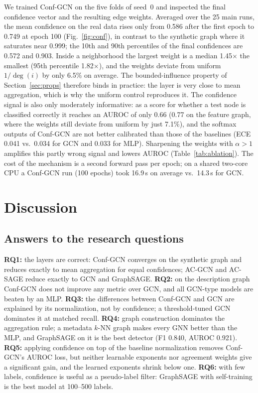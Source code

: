\documentclass[conference]{IEEEtran}
\begin{document}
We trained Conf-GCN on the five folds of seed~0 and inspected the final confidence vector and the resulting edge weights. Averaged over the 25 main runs, the mean confidence on the real data rises only from 0.586 after the first epoch to 0.749 at epoch 100 (Fig.~\ref{fig:conf}), in contrast to the synthetic graph where it saturates near 0.999; the 10th and 90th percentiles of the final confidences are 0.572 and 0.903. Inside a neighborhood the largest weight is a median 1.45$\times$ the smallest (95th percentile 1.82$\times$), and the weights deviate from uniform $1/\deg(i)$ by only 6.5\% on average. The bounded-influence property of Section~\ref{sec:props} therefore binds in practice: the layer is very close to mean aggregation, which is why the uniform control reproduces it. The confidence signal is also only moderately informative: as a score for whether a test node is classified correctly it reaches an AUROC of only 0.66 (0.77 on the feature graph, where the weights still deviate from uniform by just 7.1\%), and the softmax outputs of Conf-GCN are not better calibrated than those of the baselines (ECE 0.041 vs.\ 0.034 for GCN and 0.033 for MLP). Sharpening the weights with $\alpha>1$ amplifies this partly wrong signal and lowers AUROC (Table~\ref{tab:ablation}). The cost of the mechanism is a second forward pass per epoch; on a shared two-core CPU a Conf-GCN run (100 epochs) took 16.9\,s on average vs.\ 14.3\,s for GCN.

\section{Discussion}

\subsection{Answers to the research questions}
\textbf{RQ1:} the layers are correct: Conf-GCN converges on the synthetic graph and reduces exactly to mean aggregation for equal confidences; AC-GCN and AC-SAGE reduce exactly to GCN and GraphSAGE. \textbf{RQ2:} on the description graph Conf-GCN does not improve any metric over GCN, and all GCN-type models are beaten by an MLP. \textbf{RQ3:} the differences between Conf-GCN and GCN are explained by its normalization, not by confidence; a threshold-tuned GCN dominates it at matched recall. \textbf{RQ4:} graph construction dominates the aggregation rule; a metadata $k$-NN graph makes every GNN better than the MLP, and GraphSAGE on it is the best detector (F1 0.840, AUROC 0.921). \textbf{RQ5:} applying confidence on top of the baseline normalization removes Conf-GCN's AUROC loss, but neither learnable exponents nor agreement weights give a significant gain, and the learned exponents shrink below one. \textbf{RQ6:} with few labels, confidence is useful as a pseudo-label filter: GraphSAGE with self-training is the best model at 100--500 labels.
\end{document}
